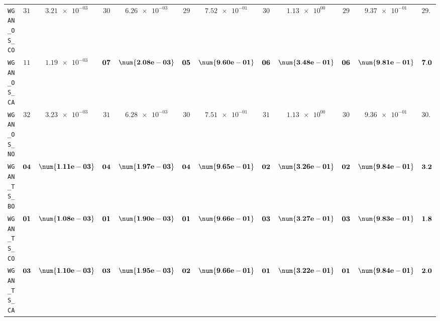 \begin{table}[H]
\begin{tabularx}{\textwidth}{l||cC|cC|cC|cC|cC||c}
		\texttt{WGAN\_OS\_CO} & $ 31$ & $ \num{3.21e-03}$ & $ 30$ & $ \num{6.26e-03}$ & $ 29$ & $ \num{7.52e-01}$ & $ 30$ & $ \num{1.13e+00}$ & $ 29$ & $ \num{9.37e-01}$ & $ 29.8$  \\
		\texttt{WGAN\_OS\_CA} & $ 11$ & $ \num{1.19e-03}$ & $\bf 07$ & $\bf \num{2.08e-03}$ & $\bf 05$ & $\bf \num{9.60e-01}$ & $\bf 06$ & $\bf \num{3.48e-01}$ & $\bf 06$ & $\bf \num{9.81e-01}$ & $\bf 7.0$  \\
		\texttt{WGAN\_OS\_NO} & $ 32$ & $ \num{3.23e-03}$ & $ 31$ & $ \num{6.28e-03}$ & $ 30$ & $ \num{7.51e-01}$ & $ 31$ & $ \num{1.13e+00}$ & $ 30$ & $ \num{9.36e-01}$ & $ 30.8$  \\
		\texttt{WGAN\_TS\_BO} & $\bf 04$ & $\bf \num{1.11e-03}$ & $\bf 04$ & $\bf \num{1.97e-03}$ & $\bf 04$ & $\bf \num{9.65e-01}$ & $\bf 02$ & $\bf \num{3.26e-01}$ & $\bf 02$ & $\bf \num{9.84e-01}$ & $\bf 3.2$  \\
		\texttt{WGAN\_TS\_CO} & $\bf 01$ & $\bf \num{1.08e-03}$ & $\bf 01$ & $\bf \num{1.90e-03}$ & $\bf 01$ & $\bf \num{9.66e-01}$ & $\bf 03$ & $\bf \num{3.27e-01}$ & $\bf 03$ & $\bf \num{9.83e-01}$ & $\bf 1.8$  \\
		\texttt{WGAN\_TS\_CA} & $\bf 03$ & $\bf \num{1.10e-03}$ & $\bf 03$ & $\bf \num{1.95e-03}$ & $\bf 02$ & $\bf \num{9.66e-01}$ & $\bf 01$ & $\bf \num{3.22e-01}$ & $\bf 01$ & $\bf \num{9.84e-01}$ & $\bf 2.0$  \\

\end{tabularx}
\end{table}
